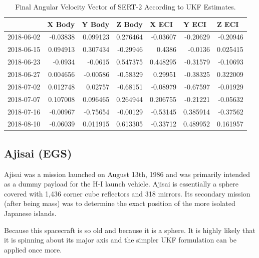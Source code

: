 \begin{table}[htbp]
	\centering
	
	\begin{tabular}{|l|r|r|r|r|r|r|}
		\hline & \multicolumn{1}{l}{X Body} & \multicolumn{1}{l}{Y Body} & \multicolumn{1}{l}{Z Body} & \multicolumn{1}{l}{X ECI} & \multicolumn{1}{l}{Y ECI} & \multicolumn{1}{l}{Z ECI} \\
		\hline 2018-06-02 & -0.03838 & 0.099123 & 0.276464 & -0.03607 & -0.20629 & -0.20946 \\
		\hline 2018-06-15 & 0.094913 & 0.307434 & -0.29946 & 0.4386 & -0.0136 & 0.025415 \\
		\hline 2018-06-23 & -0.0934 & -0.0615 & 0.547375 & 0.448295 & -0.31579 & -0.10693 \\
		\hline 2018-06-27 & 0.004656 & -0.00586 & -0.58329 & 0.29951 & -0.38325 & 0.322009 \\
		\hline 2018-07-02 & 0.012748 & 0.02757 & -0.68151 & -0.08979 & -0.67597 & -0.01929 \\
		\hline 2018-07-07 & 0.107008 & 0.096465 & 0.264944 & 0.206755 & -0.21221 & -0.05632 \\
		\hline 2018-07-16 & -0.00967 & -0.75654 & -0.00129 & -0.53145 & 0.385914 & -0.37562 \\
		\hline 2018-08-10 & -0.06039 & 0.011915 & 0.613305 & -0.33712 & 0.489952 & 0.161957 \\
		\hline 
	\end{tabular}%
	\caption{Final Angular Velocity Vector of SERT-2 According to UKF Estimates.}
\end{table}%



\subsection{Ajisai (EGS)}

Ajisai was a mission launched on August 13th, 1986 and was primarily intended as a dummy payload for the H-I launch vehicle. \cite{ajisai_jaxa} Ajisai is essentially a sphere covered with 1,436 corner cube reflectors and 318 mirrors. \cite{ajisai} Its secondary mission (after being mass) was to determine the exact position of the more isolated Japanese islands. \cite{ajisai_jaxa}

Because this spacecraft is so old and because it is a sphere. It is highly likely that it is spinning about its major axis and the simpler UKF formulation can be applied once more.

